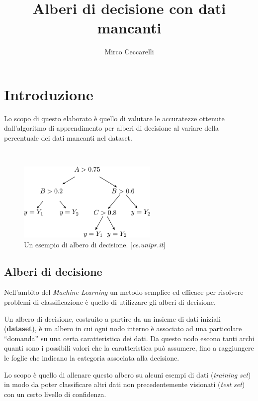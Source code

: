 \documentclass[a4paper,12pt]{article}
\title{Alberi di decisione con dati mancanti}
\author{Mirco Ceccarelli}
\begin{document}
\maketitle

\section{Introduzione}
Lo scopo di questo elaborato è quello di valutare le accuratezze ottenute dall'algoritmo di apprendimento per alberi di
decisione al variare della percentuale dei dati mancanti nel dataset.

\
\begin{figure}[h]
    \centering
    \captionsetup{justification=centering,margin=1cm}
    \includegraphics[width=0.6\textwidth]{./fig_decisiontree}
    \vspace*{5mm}
    \caption{Un esempio di albero di decisione. [\textit{ce.unipr.it}]}
    \label{fig:dec}
\end{figure}

\subsection{Alberi di decisione}

Nell’ambito del \textit{Machine Learning} un metodo semplice ed efficace per risolvere problemi di classificazione è quello di utilizzare gli alberi di decisione.
\newline

 Un albero di decisione, costruito a partire da un insieme di dati iniziali (\textbf{dataset}), è un albero in cui ogni nodo interno è associato ad una particolare “domanda” su una certa caratteristica dei dati. Da questo nodo escono tanti archi quanti sono i possibili valori che la caratteristica può assumere, fino a raggiungere le foglie che indicano la categoria associata alla decisione.
 \newline

 Lo scopo è quello di allenare questo albero su alcuni esempi di dati (\textit{training set}) in modo da poter classificare altri dati non precedentemente visionati (\textit{test set}) con un certo livello di confidenza.
\newline
\end{document}
